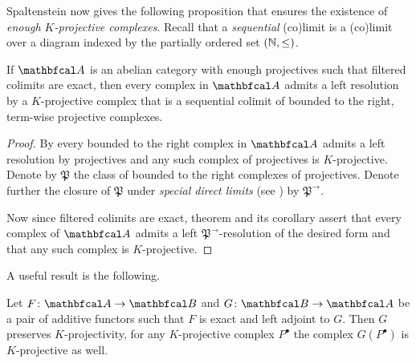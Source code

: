 Spaltenstein now gives the following proposition that ensures the existence of \emph{enough $K$-projective complexes}. Recall that a \emph{sequential} (co)limit is a (co)limit over a diagram indexed by the partially ordered set $({\mathbb{N}}, \le)$.
\begin{proposition}
	\label{proposition: enough projectives on steroids}
	
	If $\category{A}$ is an abelian category with enough projectives such that filtered colimits are exact, then every complex in $\category{A}$ admits a left resolution by a $K$-projective complex that is a sequential colimit of bounded to the right, term-wise projective complexes.
\end{proposition}
\begin{proof}
	By \cite[Example. 3.2 (a)]{spaltenstein} every bounded to the right complex in $\category{A}$ admits a left resolution by projectives and any such complex of projectives is $K$-projective. Denote by $\mathfrak P$ the class of bounded to the right complexes of projectives. Denote further the closure of $\mathfrak{P}$ under \emph{special direct limits} (see \cite[Def. 2.6]{spaltenstein}) by $\mathfrak P^\rightarrow$.
	
	Now since filtered colimits are exact, theorem \cite[Thm. 3.4]{spaltenstein} and its corollary \cite[Cor. 3.5]{spaltenstein} assert that every complex of $\category{A}$ admits a left $\mathfrak P^\rightarrow$-resolution of the desired form and that any such complex is $K$-projective.
\end{proof}

A useful result is the following.
\begin{lemma}
	\label{lemma: preservation of K-projectivity}
	
	Let $F\colon \category{A} \to \category{B}$ and $G\colon \category{B} \to \category{A}$ be a pair of additive functors such that $F$ is exact and left adjoint to $G$. Then $G$ preserves $K$-projectivity, \ie for any $K$-projective complex $P^\bullet$ the complex $G(P^\bullet)$ is $K$-projective as well.
\end{lemma}

